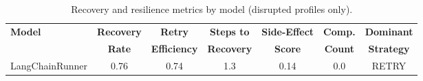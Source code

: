 \begin{table}[h]
\centering
\caption{Recovery and resilience metrics by model (disrupted profiles only).}
\label{tab:recovery}
\begin{tabular}{lcccccc}
\toprule
\textbf{Model} & \textbf{Recovery} & \textbf{Retry} & \textbf{Steps to} & \textbf{Side-Effect} & \textbf{Comp.} & \textbf{Dominant} \\
 & \textbf{Rate} & \textbf{Efficiency} & \textbf{Recovery} & \textbf{Score} & \textbf{Count} & \textbf{Strategy} \\
\midrule
LangChainRunner & 0.76 & 0.74 & 1.3 & 0.14 & 0.0 & RETRY \\
\bottomrule
\end{tabular}
\end{table}